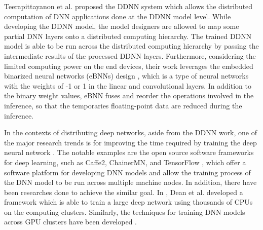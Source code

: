 \documentclass[conference]{IEEEtran}
\begin{document}
Teerapittayanon et al. \cite{Teerapittayanon17} proposed the DDNN system which allows the distributed computation of DNN applications done at the DDNN model level. While developing the DDNN model, the model designers are allowed to map some partial DNN layers onto a distributed computing hierarchy. The trained DDNN model is able to be run across the distributed computing hierarchy by passing the intermediate results of the processed DDNN layers.
Furthermore, considering the limited computing power on the end devices, their work leverages the embedded binarized neural networks (eBNNs) design \cite{McDanel17}, which is a type of neural networks with the weights of -1 or 1 in the linear and convolutional layers. In addition to the binary weight values, eBNN fuses and reorder the operations involved in the inference, so that the temporaries floating-point data are reduced during the inference.

In the contexts of distributing deep networks, aside from the DDNN work, one of the major research trends is for improving the time required by training the deep neural network \cite{tensorflow16,Caffe217,Chainer17,dean2012large,iandola2016firecaffe,dean2015large}. The notable examples are the open source software frameworks for deep learning, such as Caffe2, ChainerMN, and TensorFlow \cite{tensorflow16,Caffe217,Chainer17,akiba2017chainermn}, which offer a software platform for developing DNN models and allow the training process of the DNN model to be run across multiple machine nodes. In addition, there have been researches done to achieve the similar goal. In \cite{dean2012large}, Dean et al. developed a framework which is able to train a large deep network using thousands of CPUs on the computing clusters. Similarly, the techniques for training DNN models across GPU clusters have been developed \cite{iandola2016firecaffe,dean2015large}.
\end{document}
